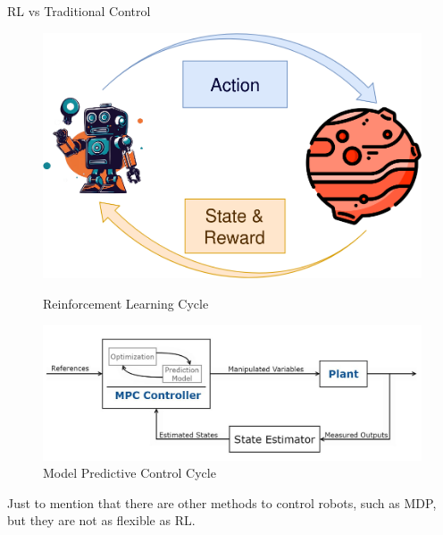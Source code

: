 \begin{frame}{RL vs Traditional Control}
    \begin{figure}[ht]
        \begin{minipage}[b]{0.3\linewidth}
            \centering
            \includegraphics[width=\textwidth]{img/rl-cycle.png}
            \caption{\small Reinforcement Learning Cycle}
        \end{minipage}
        \begin{minipage}[b]{0.68\linewidth}
            \centering
            \includegraphics[width=\textwidth]{img/mpc.jpg}
            \caption{\small Model Predictive Control Cycle}
        \end{minipage}
    \end{figure}

    Just to mention that there are other methods to control robots, such as MDP, but they are not as flexible as RL.
\end{frame}

